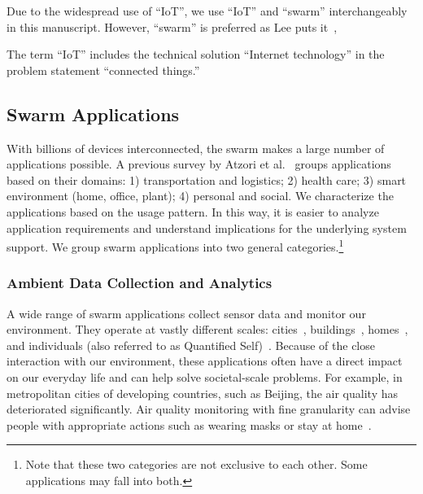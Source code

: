Due to the widespread use of ``IoT'', we use ``IoT'' and ``swarm''
interchangeably in this manuscript. However, ``swarm'' is preferred as Lee puts
it~\cite{lee2016iot},

\begin{displayquote}
  The term ``IoT'' includes the technical solution ``Internet technology'' in
  the problem statement ``connected things.''
\end{displayquote}

\subsection{Swarm Applications}
\label{sec:swarm-applications}

With billions of devices interconnected, the swarm makes a large number of
applications possible. A previous survey by Atzori et
al.~\cite{atzori2010internet} groups applications based on their domains: 1)
transportation and logistics; 2) health care; 3) smart environment (home,
office, plant); 4) personal and social. We characterize the applications based
on the usage pattern. In this way, it is easier to analyze application
requirements and understand implications for the underlying system support. We
group swarm applications into two general categories.\footnote{Note that these
  two categories are not exclusive to each other. Some applications may fall
  into both.}

\subsubsection{Ambient Data Collection and Analytics}
\label{sec:ambi-data-coll}

A wide range of swarm applications collect sensor data and monitor our
environment. They operate at vastly different scales:
cities~\cite{cheng2014aircloud, sfpark}, buildings~\cite{dawson2010smap},
homes~\cite{hnat2011hitchhiker}, and individuals (also referred to as Quantified
Self)~\cite{fitbit, swan2013quantified}. Because of the close interaction with
our environment, these applications often have a direct impact on our everyday
life and can help solve societal-scale problems. For example, in metropolitan
cities of developing countries, such as Beijing, the air quality has
deteriorated significantly. Air quality monitoring with fine granularity can
advise people with appropriate actions such as wearing masks or stay at
home~\cite{cheng2014aircloud}.

